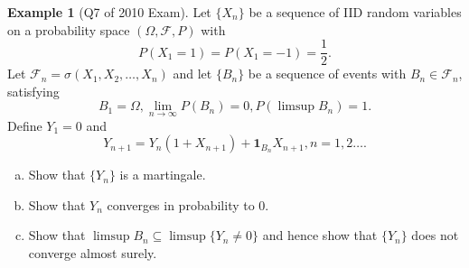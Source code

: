 \documentclass[10pt, oneside, reqno]{amsart}
\theoremstyle{plain}%
\theoremstyle{definition}
\newtheorem{exmp}[thm]{Example}
\theoremstyle{remark}
\newcommand{\sigf}{\mathcal{F}}
\begin{document}
\begin{exmp}[Q7 of 2010 Exam]
    Let $\{ X_n \}$ be a sequence of IID random variables on a probability space $(\Omega, \sigf, P)$ with \[
        P(X_1 = 1) = P(X_1 = -1) = \frac{1}{2}.
    \]  Let $\sigf_n = \sigma(X_1, X_2, \dots, X_n)$ and let $\{B_n\}$ be a sequence of events with $B_n \in \sigf_n$, satisfying \[
        B_1 = \Omega, \lim_{n \rightarrow \infty} P(B_n) = 0, P(\limsup B_n) = 1.
    \]  Define $Y_1 = 0$ and \[
        Y_{n+1} = Y_n(1 + X_{n+1}) + \mathbf{1}_{B_n} X_{n+1}, n = 1, 2 \dots.
    \]
    \begin{enumerate}[(a)]
        \item Show that $\{ Y_n \}$ is a martingale.
        \item Show that $Y_n$ converges in probability to 0.
        \item Show that $\limsup B_n \subseteq \limsup \{ Y_n \neq 0 \}$ and hence show that $\{ Y_n \}$ does not converge almost surely.
    \end{enumerate}
\end{exmp} 
\end{document}
